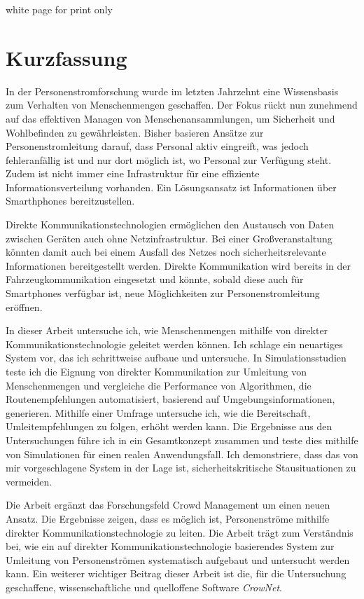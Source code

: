 \documentclass[
							a4paper, 
							11pt, 
							openany, 
							bibtotoc, 
							parskip=half, 
   							headings=normal,
   							bibliography=totoc
						]{scrreprt}
\begin{document}
\newpage


{\color{white} white page for print only}

\newpage


\section*{\centering Kurzfassung}


In der Personenstromforschung wurde im letzten Jahrzehnt eine Wissensbasis zum Verhalten von Menschenmengen geschaffen. Der Fokus rückt nun zunehmend auf das effektiven Managen von Menschenansammlungen, um Sicherheit und Wohlbefinden zu gewährleisten. Bisher basieren Ansätze zur Personenstromleitung darauf, dass Personal aktiv eingreift, was jedoch fehleranfällig ist und nur dort möglich ist, wo Personal zur Verfügung steht. Zudem ist nicht immer eine Infrastruktur für eine effiziente Informationsverteilung vorhanden.
Ein Lösungsansatz ist Informationen über Smarthphones bereitzustellen.

Direkte Kommunikationstechnologien ermöglichen den Austausch von Daten zwischen Geräten auch ohne Netzinfrastruktur. Bei einer Großveranstaltung könnten damit auch bei einem Ausfall des Netzes noch sicherheitsrelevante Informationen bereitgestellt werden. Direkte Kommunikation wird bereits in der Fahrzeugkommunikation eingesetzt und könnte, sobald diese auch für Smartphones verfügbar ist, neue Möglichkeiten zur Personenstromleitung eröffnen. 

In dieser Arbeit untersuche ich, wie Menschenmengen mithilfe von direkter Kommunikationstechnologie geleitet werden können. Ich schlage ein neuartiges System vor, das ich schrittweise aufbaue und untersuche. In Simulationsstudien teste ich die Eignung von direkter Kommunikation zur Umleitung von Menschenmengen und vergleiche die Performance von Algorithmen, die Routenempfehlungen automatisiert, basierend auf Umgebungsinformationen, generieren. Mithilfe einer Umfrage untersuche ich, wie die Bereitschaft, Umleitempfehlungen zu folgen, erhöht werden kann. Die Ergebnisse aus den Untersuchungen führe ich in ein Gesamtkonzept zusammen und teste dies mithilfe von Simulationen für einen realen Anwendungsfall. Ich demonstriere, dass das von mir vorgeschlagene System in der Lage ist, sicherheitskritische Stausituationen zu vermeiden.

Die Arbeit ergänzt das Forschungsfeld Crowd Management um einen neuen Ansatz. Die Ergebnisse zeigen, dass es möglich ist, Personenströme mithilfe direkter Kommunikationstechnologie zu leiten. Die Arbeit trägt zum Verständnis bei, wie ein auf direkter Kommunikationstechnologie basierendes System zur Umleitung von Personenströmen systematisch aufgebaut und untersucht werden kann. Ein weiterer wichtiger Beitrag dieser Arbeit ist die, für die Untersuchung geschaffene, wissenschaftliche und quelloffene Software \textit{CrowNet}.
\end{document}

